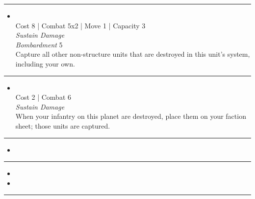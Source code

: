 \begin{multicols}{2}
\vspace{-10pt}\rule{\hsize}{0.4pt}\vspace{5pt}


\begin{itemize}
\item {}\\
Cost 8 | Combat 5x2 | Move 1 | Capacity 3 \\
\emph{Sustain Damage}\\
\emph{Bombardment} 5\\
Capture all other non-structure units that are destroyed in this unit's system, including your own.
\end{itemize}

\vspace{-10pt}\rule{\hsize}{0.4pt}\vspace{5pt}


\begin{itemize}
\item {}
\\
Cost 2 | Combat 6 \\
\emph{Sustain Damage}\\
When your infantry on this planet are destroyed, place them on your faction sheet; those units are captured.
\end{itemize}

\vspace{-10pt}\rule{\hsize}{0.4pt}\vspace{5pt}


\begin{itemize}
\item \dimensionalTearI
\end{itemize}

\vspace{-10pt}\rule{\hsize}{0.4pt}\vspace{5pt}

\begin{itemize}
\item \dimensionalTearII
\item \vortex
\end{itemize}

\vspace{-10pt}\rule{\hsize}{0.4pt}\vspace{5pt}


\end{multicols}
